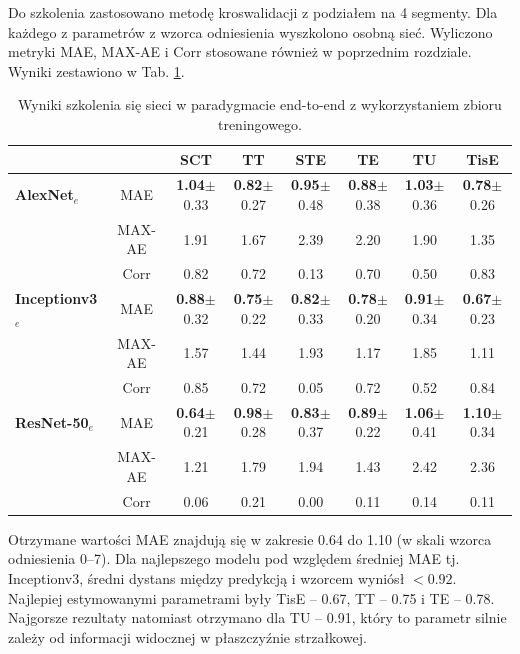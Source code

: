 Do szkolenia zastosowano metodę kroswalidacji z podziałem na 4 segmenty. Dla każdego z parametrów z wzorca odniesienia wyszkolono osobną sieć. Wyliczono metryki MAE, MAX-AE i Corr stosowane również w poprzednim rozdziale. Wyniki zestawiono w Tab. \ref{tab:end-to-endTrain}.
\begin{table}[ht]
\scriptsize
\setlength{\tabcolsep}{1pt}
\centering
\caption{Wyniki szkolenia się sieci w paradygmacie end-to-end z wykorzystaniem zbioru treningowego.}
\label{tab:end-to-endTrain}
\begin{tabular}{lc||c|c|c|c|c|c}
	&& \textbf{SCT} & \textbf{TT} & \textbf{STE} & \textbf{TE} & \textbf{TU} & \textbf{TisE}\\ \hline
	\textbf{AlexNet$_{e}$} & MAE & \textbf{1.04}$\pm$0.33 & \textbf{0.82}$\pm$0.27 & \textbf{0.95}$\pm$0.48 & \textbf{0.88}$\pm$0.38 & \textbf{1.03}$\pm$0.36 & \textbf{0.78}$\pm$0.26  \\
	&MAX-AE & 1.91 & 1.67 & 2.39 & 2.20 & 1.90 & 1.35\\ 
	&Corr & 0.82 & 0.72 & 0.13 & 0.70 & 0.50 & 0.83 \\ \hline
	\textbf{Inceptionv3$_{e}$} & MAE & \textbf{0.88}$\pm$0.32 & \textbf{0.75}$\pm$0.22 & \textbf{0.82}$\pm$0.33 & \textbf{0.78}$\pm$0.20 & \textbf{0.91}$\pm$0.34 & \textbf{0.67}$\pm$0.23 \\
	&MAX-AE & 1.57 & 1.44 & 1.93 & 1.17 & 1.85 & 1.11 \\ 
	&Corr & 0.85 & 0.72 & 0.05 & 0.72 & 0.52 & 0.84 \\ \hline
	\textbf{ResNet-50$_{e}$} & MAE & \textbf{0.64}$\pm$0.21 & \textbf{0.98}$\pm$0.28 & \textbf{0.83}$\pm$0.37 & \textbf{0.89}$\pm$0.22 & \textbf{1.06}$\pm$0.41 & \textbf{1.10}$\pm$0.34  \\
	&MAX-AE & 1.21 & 1.79 & 1.94 & 1.43 & 2.42 & 2.36\\
	&Corr & 0.06 & 0.21 & 0.00 & 0.11 & 0.14 & 0.11\\
	
	
\end{tabular}
\end{table}

Otrzymane wartości MAE znajdują się w zakresie 0.64 do 1.10 (w skali wzorca odniesienia 0--7). Dla najlepszego modelu pod względem średniej MAE tj. Inceptionv3, średni dystans między predykcją i wzorcem wyniósł $<0.92$. Najlepiej estymowanymi parametrami były TisE -- 0.67, TT -- 0.75 i TE -- 0.78. Najgorsze rezultaty natomiast otrzymano dla TU -- 0.91, który to parametr silnie zależy od informacji widocznej w płaszczyźnie strzałkowej.

